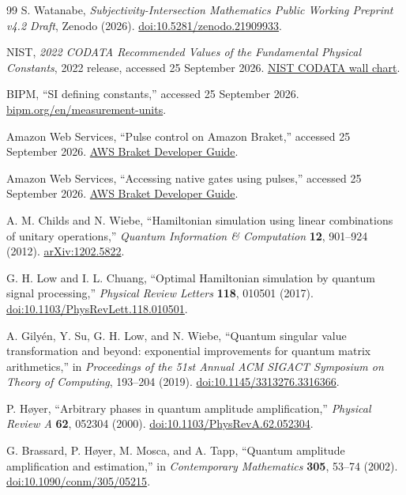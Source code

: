 \documentclass[11pt]{article}
\theoremstyle{definition}
\theoremstyle{remark}
\begin{document}
\begin{thebibliography}{99}
S. Watanabe, \emph{Subjectivity-Intersection Mathematics Public Working Preprint v4.2 Draft}, Zenodo (2026). \href{https://doi.org/10.5281/zenodo.21909933}{doi:10.5281/zenodo.21909933}.

NIST, \emph{2022 CODATA Recommended Values of the Fundamental Physical Constants}, 2022 release, accessed 25 September 2026. \href{https://www.physics.nist.gov/cuu/pdf/wall_2022.pdf}{NIST CODATA wall chart}.

BIPM, ``SI defining constants,'' accessed 25 September 2026. \href{https://www.bipm.org/en/measurement-units}{bipm.org/en/measurement-units}.

Amazon Web Services, ``Pulse control on Amazon Braket,'' accessed 25 September 2026. \href{https://docs.aws.amazon.com/braket/latest/developerguide/braket-pulse-control.html}{AWS Braket Developer Guide}.

Amazon Web Services, ``Accessing native gates using pulses,'' accessed 25 September 2026. \href{https://docs.aws.amazon.com/braket/latest/developerguide/braket-native-gate-pulse.html}{AWS Braket Developer Guide}.

A. M. Childs and N. Wiebe, ``Hamiltonian simulation using linear combinations of unitary operations,'' \emph{Quantum Information \& Computation} \textbf{12}, 901--924 (2012). \href{https://arxiv.org/abs/1202.5822}{arXiv:1202.5822}.

G. H. Low and I. L. Chuang, ``Optimal Hamiltonian simulation by quantum signal processing,'' \emph{Physical Review Letters} \textbf{118}, 010501 (2017). \href{https://doi.org/10.1103/PhysRevLett.118.010501}{doi:10.1103/PhysRevLett.118.010501}.

A. Gily\'en, Y. Su, G. H. Low, and N. Wiebe, ``Quantum singular value transformation and beyond: exponential improvements for quantum matrix arithmetics,'' in \emph{Proceedings of the 51st Annual ACM SIGACT Symposium on Theory of Computing}, 193--204 (2019). \href{https://doi.org/10.1145/3313276.3316366}{doi:10.1145/3313276.3316366}.

P. H\o yer, ``Arbitrary phases in quantum amplitude amplification,'' \emph{Physical Review A} \textbf{62}, 052304 (2000). \href{https://doi.org/10.1103/PhysRevA.62.052304}{doi:10.1103/PhysRevA.62.052304}.

G. Brassard, P. H\o yer, M. Mosca, and A. Tapp, ``Quantum amplitude amplification and estimation,'' in \emph{Contemporary Mathematics} \textbf{305}, 53--74 (2002). \href{https://doi.org/10.1090/conm/305/05215}{doi:10.1090/conm/305/05215}.

\end{thebibliography}
\end{document}
